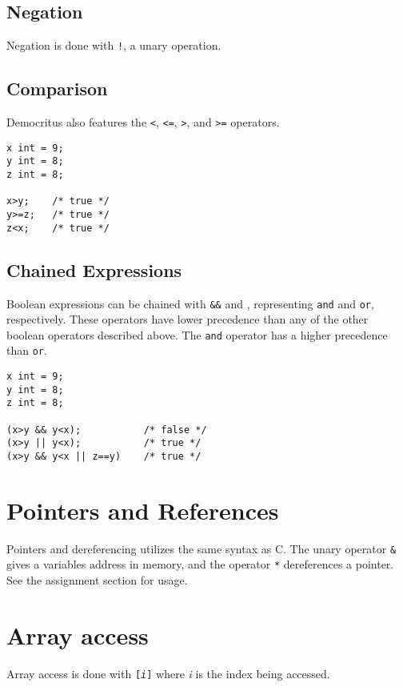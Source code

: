 		\subsection{Negation}
			Negation is done with \texttt{!}, a unary operation.

        \subsection{Comparison}
            Democritus also features the \texttt{\textless}, \texttt{\textless =}, \texttt{\textgreater}, and \texttt{\textgreater =} operators.  
            
            \begin{lstlisting}
x int = 9;
y int = 8;
z int = 8;

x>y;    /* true */
y>=z;   /* true */
z<x;    /* true */
            \end{lstlisting}

        \subsection{Chained Expressions}
            Boolean expressions can be chained with \texttt{\&\&} and \texttt{\textbar\textbar}, representing \texttt{and} and \texttt{or}, respectively. These operators have lower precedence than any of the other boolean operators described above. The \texttt{and} operator has a higher precedence than \texttt{or}.

            \begin{lstlisting}
x int = 9;
y int = 8;
z int = 8;

(x>y && y<x);    		/* false */
(x>y || y<x);  	 		/* true */
(x>y && y<x || z==y)    /* true */
            \end{lstlisting}
            
	\section{Pointers and References}
		Pointers and dereferencing utilizes the same syntax as C. The unary operator \texttt{\&} gives a variables address in memory, and the operator \texttt{*} dereferences a pointer. See the assignment section for usage.
		
	\section{Array access}
		Array access is done with \texttt{[\textit{i}]} where \textit{i} is the index being accessed. 
		
